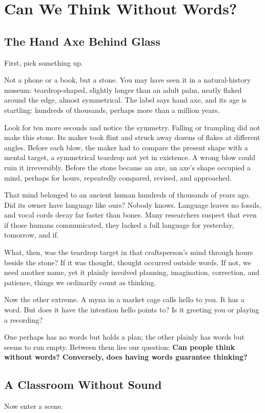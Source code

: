 \chapter{Can We Think Without Words?}
\section{The Hand Axe Behind Glass}
First, pick something up.

Not a phone or a book, but a stone. You may have seen it in a natural-history museum: teardrop-shaped, slightly longer than an adult palm, neatly flaked around the edge, almost symmetrical. The label says hand axe, and its age is startling: hundreds of thousands, perhaps more than a million years.

Look for ten more seconds and notice the symmetry. Falling or trampling did not make this stone. Its maker took flint and struck away dozens of flakes at different angles. Before each blow, the maker had to compare the present shape with a mental target, a symmetrical teardrop not yet in existence. A wrong blow could ruin it irreversibly. Before the stone became an axe, an axe's shape occupied a mind, perhaps for hours, repeatedly compared, revised, and approached.

That mind belonged to an ancient human hundreds of thousands of years ago. Did its owner have language like ours? Nobody knows. Language leaves no fossils, and vocal cords decay far faster than bones. Many researchers suspect that even if those humans communicated, they lacked a full language for yesterday, tomorrow, and if.

What, then, was the teardrop target in that craftsperson's mind through hours beside the stone? If it was thought, thought occurred outside words. If not, we need another name, yet it plainly involved planning, imagination, correction, and patience, things we ordinarily count as thinking.

Now the other extreme. A myna in a market cage calls hello to you. It has a word. But does it have the intention hello points to? Is it greeting you or playing a recording?

One perhaps has no words but holds a plan; the other plainly has words but seems to run empty. Between them lies our question: \textbf{Can people think without words? Conversely, does having words guarantee thinking?}

\section{A Classroom Without Sound}
Now enter a scene.

